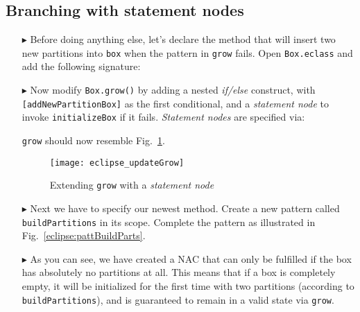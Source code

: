 \newpage
\hypertarget{conBran tex}{}
\subsection{Branching with statement nodes}
\texHeader

\begin{itemize}

\item[$\blacktriangleright$] Before doing anything else, let's declare the method that will insert two new partitions into \texttt{box} when the
pattern in \texttt{grow} fails. Open \texttt{Box.eclass} and add the following signature: 

\vspace{0.5cm}

\item[$\blacktriangleright$] Now modify \texttt{Box.grow()} by adding a nested \emph{if/else} construct, with \texttt{[addNewPartitionBox]} as the
first conditional, and a \emph{statement node} to invoke \texttt{initializeBox} if it fails. \emph{Statement nodes} are specified via:


\texttt{grow} should now resemble Fig.~\ref{eclipse:updateGrow}.

\vspace{0.5cm}

\begin{figure}[htp]
\begin{center}
  \texttt{[image: eclipse\_updateGrow]}
  \caption{Extending \texttt{grow} with a \emph{statement node}}
  \label{eclipse:updateGrow}
\end{center}
\end{figure}

\vspace{0.5cm}

\item[$\blacktriangleright$] Next we have to specify our newest method. Create a new pattern called \texttt{buildPartitions} in its scope. Complete
the pattern as illustrated in Fig.~\ref{eclipse:pattBuildParts}.

\item[$\blacktriangleright$] As you can see, we have created a NAC that can only be fulfilled if the box has absolutely no partitions at all. This means that if
a box is completely empty, it will be initialized for the first time with two partitions (according to \texttt{buildPartitions}), and is guaranteed to remain in
a valid state via \texttt{grow}.


\end{itemize}

